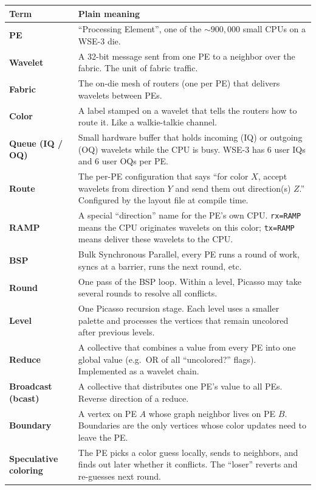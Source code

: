 \documentclass[11pt]{article}
\newcommand{\code}[1]{\texttt{#1}}
\begin{document}
\begin{longtable}{p{4.0cm} p{10.5cm}}
\toprule
Term & Plain meaning \\
\midrule
\endhead
\textbf{PE} & ``Processing Element'', one of the $\sim\!900{,}000$ small CPUs on a WSE-3 die. \\
\textbf{Wavelet} & A 32-bit message sent from one PE to a neighbor over the fabric. The unit of fabric traffic. \\
\textbf{Fabric} & The on-die mesh of routers (one per PE) that delivers wavelets between PEs. \\
\textbf{Color} & A label stamped on a wavelet that tells the routers how to route it. Like a walkie-talkie channel. \\
\textbf{Queue (IQ / OQ)} & Small hardware buffer that holds incoming (IQ) or outgoing (OQ) wavelets while the CPU is busy. WSE-3 has 6 user IQs and 6 user OQs per PE. \\
\textbf{Route} & The per-PE configuration that says ``for color $X$, accept wavelets from direction $Y$ and send them out direction(s) $Z$.'' Configured by the layout file at compile time. \\
\textbf{RAMP} & A special ``direction'' name for the PE's own CPU. \code{rx=RAMP} means the CPU originates wavelets on this color; \code{tx=RAMP} means deliver these wavelets to the CPU. \\
\textbf{BSP} & Bulk Synchronous Parallel, every PE runs a round of work, syncs at a barrier, runs the next round, etc. \\
\textbf{Round} & One pass of the BSP loop. Within a level, Picasso may take several rounds to resolve all conflicts. \\
\textbf{Level} & One Picasso recursion stage. Each level uses a smaller palette and processes the vertices that remain uncolored after previous levels. \\
\textbf{Reduce} & A collective that combines a value from every PE into one global value (e.g.\ OR of all ``uncolored?'' flags). Implemented as a wavelet chain. \\
\textbf{Broadcast (bcast)} & A collective that distributes one PE's value to all PEs. Reverse direction of a reduce. \\
\textbf{Boundary} & A vertex on PE $A$ whose graph neighbor lives on PE $B$. Boundaries are the only vertices whose color updates need to leave the PE. \\
\textbf{Speculative coloring} & The PE picks a color guess locally, sends to neighbors, and finds out later whether it conflicts. The ``loser'' reverts and re-guesses next round. \\

\end{longtable}
\end{document}
